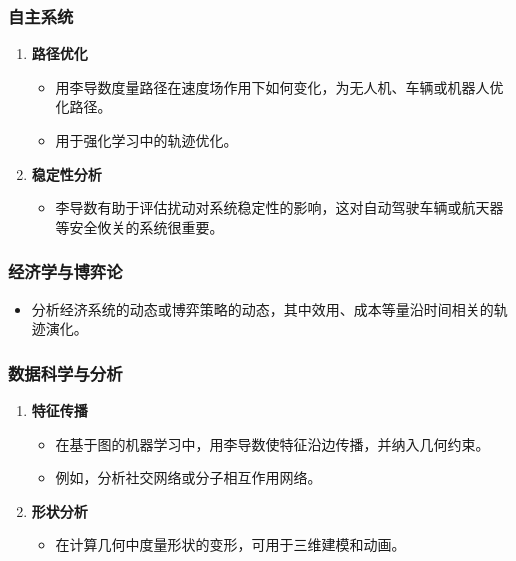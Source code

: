 \subsubsection{自主系统}
\begin{enumerate}[label=\alph*.]
  \item \textbf{路径优化}
  \begin{itemize}
    \item 用李导数度量路径在速度场作用下如何变化，为无人机、车辆或机器人优化路径。
    \item 用于强化学习中的轨迹优化。
  \end{itemize}
  \item \textbf{稳定性分析}
  \begin{itemize}
    \item 李导数有助于评估扰动对系统稳定性的影响，这对自动驾驶车辆或航天器等安全攸关的系统很重要。
  \end{itemize}
\end{enumerate}

\subsubsection{经济学与博弈论}
\begin{itemize}
  \item 分析经济系统的动态或博弈策略的动态，其中效用、成本等量沿时间相关的轨迹演化。
\end{itemize}

\subsubsection{数据科学与分析}
\begin{enumerate}[label=\alph*.]
  \item \textbf{特征传播}
  \begin{itemize}
    \item 在基于图的机器学习中，用李导数使特征沿边传播，并纳入几何约束。
    \item 例如，分析社交网络或分子相互作用网络。
  \end{itemize}
  \item \textbf{形状分析}
  \begin{itemize}
    \item 在计算几何中度量形状的变形，可用于三维建模和动画。
  \end{itemize}
\end{enumerate}

